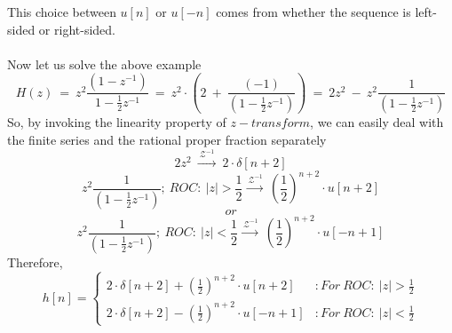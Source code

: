 This choice between $u[n]$ or $u[-n]$ comes from whether the sequence is left-sided or right-sided.\\\\
Now let us solve the above example
\[ H(z)\ =\ z^2\frac{(1 - z^{-1})}{1 - \frac{1}{2}z^{-1}}\ =\ z^2\cdot(2\ +\ \frac{(-1)}{(1 - \frac{1}{2}z^{-1})})\ =\ 2z^2\ -\ z^2\frac{1}{(1 - \frac{1}{2}z^{-1})} \]
So, by invoking the linearity property of $z-transform$, we can easily deal with the finite series and the rational proper fraction separately
\[ 2z^2\ \xrightarrow{\ \mathcal{Z}^{-1}\ }\ 2\cdot\delta[n+2]\]
\[ z^2\frac{1}{(1 - \frac{1}{2}z^{-1})};\ ROC:\ |z| > \frac{1}{2} \xrightarrow{\ \mathcal{Z}^{-1}}\ (\frac{1}{2})^{n+2}\cdot u[n+2]\]
\[ or\]
\[z^2\frac{1}{(1 - \frac{1}{2}z^{-1})};\ ROC:\ |z| < \frac{1}{2} \xrightarrow{\ \mathcal{Z}^{-1}}\ (\frac{1}{2})^{n+2}\cdot u[-n+1]\]
Therefore,
\begin{displaymath}
   h[n] = \left\{
     \begin{array}{lr}
       2\cdot\delta[n+2] + (\frac{1}{2})^{n+2}\cdot u[n+2]  & :  For\ ROC:\ |z|>\frac{1}{2}\\
       2\cdot\delta[n+2] - (\frac{1}{2})^{n+2}\cdot u[-n+1] & :  For\ ROC:\ |z|<\frac{1}{2}
     \end{array}
   \right.
\end{displaymath} 






